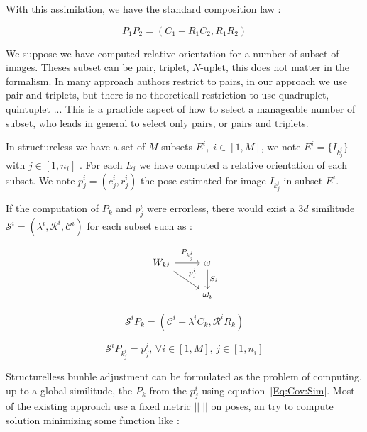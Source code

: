 With this assimilation, we have the standard composition law :

\begin{equation}
   P_1 P_2 = (C_1 + R_1 C_2, R_1 R_2)
\end{equation}

We suppose we have computed relative orientation for a number of subset
of images. Theses subset can be pair, triplet, $N$-uplet, this does
not matter in the formalism.  In many approach authors restrict to
pairs, in our approach we use pair and triplets, but there is
no theoreticall restriction to use quadruplet, quintuplet ...  This is
a practicle aspect of how to select a manageable number of subset,  who leads in
general to select only pairs, or pairs and triplets.


In structureless we have a set of  $M$ subsets  $E^i, \; i \in [1,M]$, 
we note   $E^i =  \{I_{k^i_j}\}$ with $j \in [1,n_i]$  .  For each $E_i$
we have computed a relative orientation of each subset.  We note $p^i_j = (c^i_j,r^i_j)$ the pose
estimated for image $I_{k^i_j}$     in subset $E^i$. 

If the computation of $P_k$ and $p^i_j$  were errorless, there would
exist a $3d$ similitude $\mathcal{S}^i = (\lambda^i ,\mathcal {R}^i ,\mathcal{C}^i) $ for each subset such as :


\begin{equation}
\begin{tikzcd}
     W_{k^j} \arrow[rd,"p^i_j"]\arrow[r, "P_{k^i_j}"] & \omega   \arrow[d, "S_i" ]   \\
                                  & \omega_i
\end{tikzcd}
\end{equation}

\begin{equation}
    \mathcal{S}^i  P_k   =   (\mathcal{C}^i + \lambda^i C_k, \mathcal{R}^i  R_k ) \label{Eq:Def:Sim}
\end{equation}

\begin{equation}
    \mathcal{S}^i  P_{k^i_j}  =  p^i_j  ,\,  \forall i \in [1,M] , \, j \in [1,n_i] \label{Eq:Cov:Sim}
\end{equation}


Structurelless bunble adjustment can be formulated as the problem of computing,
up to a global similitude, the $P_k$ from the $p^i_j$ using equation~\ref{Eq:Cov:Sim}.
Most of the existing approach use a fixed  metric $||\;||$ on poses, an try to compute  solution
minimizing some function like :


